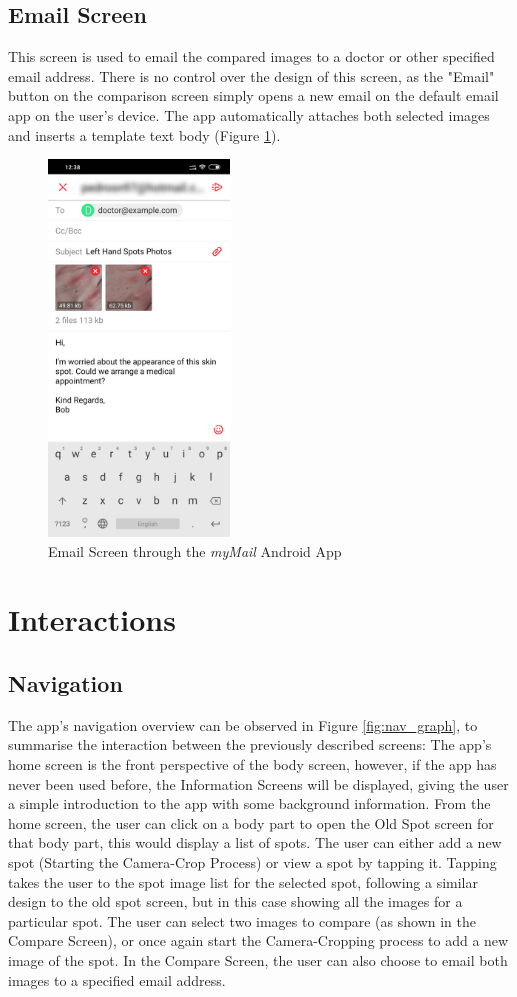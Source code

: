 \subsection{Email Screen}
This screen is used to email the compared images to a doctor or other specified email address. There is no control over the design of this screen, as the "Email" button on the comparison screen simply opens a new email on the default email app on the user's device. The app automatically attaches both selected images and inserts a template text body (Figure \ref{fig:emailscreen}). 

\begin{figure}
    \includegraphics[height=10cm, center]{figures/email_android.jpg}
    \caption{Email Screen through the \emph{myMail} Android App}
    \label{fig:emailscreen}
\end{figure}

\section{Interactions}
\subsection{Navigation}
The app's navigation overview can be observed in Figure \ref{fig:nav_graph}, to summarise the interaction between the previously described screens: The app's home screen is the front perspective of the body screen, however, if the app has never been used before, the Information Screens will be displayed, giving the user a simple introduction to the app with some background information. From the home screen, the user can click on a body part to open the Old Spot screen for that body part, this would display a list of spots. The user can either add a new spot (Starting the Camera-Crop Process) or view a spot by tapping it. Tapping takes the user to the spot image list for the selected spot, following a similar design to the old spot screen, but in this case showing all the images for a particular spot. The user can select two images to compare (as shown in the Compare Screen), or once again start the Camera-Cropping process to add a new image of the spot. In the Compare Screen, the user can also choose to email both images to a specified email address.

